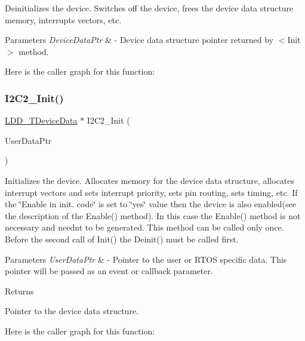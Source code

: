 Deinitializes the device. Switches off the device, frees the device data structure memory, interrupts vectors, etc. 


\begin{DoxyParams}{Parameters}
{\em Device\+Data\+Ptr} & -\/ Device data structure pointer returned by $<$\+Init$>$ method. \\
\hline
\end{DoxyParams}
Here is the caller graph for this function\+:
\mbox{\label{group___i2_c2__module_gaedf92a853b529ab46925ac39933f5033}} 
\subsubsection{\texorpdfstring{I2\+C2\+\_\+\+Init()}{I2C2\_Init()}}
{\footnotesize\ttfamily \hyperlink{group___p_e___types__module_gac5cf1362f1f0e3a2ce71b1bf2276d091}{L\+D\+D\+\_\+\+T\+Device\+Data} $\ast$ I2\+C2\+\_\+\+Init (\begin{DoxyParamCaption}\item[{\hyperlink{group___p_e___types__module_ga0b66a73f87238a782318aa0be7578e35}{L\+D\+D\+\_\+\+T\+User\+Data} $\ast$}]{User\+Data\+Ptr }\end{DoxyParamCaption})}



Initializes the device. Allocates memory for the device data structure, allocates interrupt vectors and sets interrupt priority, sets pin routing, sets timing, etc. If the \char`\"{}\+Enable in init. code\char`\"{} is set to \char`\"{}yes\char`\"{} value then the device is also enabled(see the description of the Enable() method). In this case the Enable() method is not necessary and needn\textquotesingle{}t to be generated. This method can be called only once. Before the second call of Init() the Deinit() must be called first. 


\begin{DoxyParams}{Parameters}
{\em User\+Data\+Ptr} & -\/ Pointer to the user or R\+T\+OS specific data. This pointer will be passed as an event or callback parameter. \\
\hline
\end{DoxyParams}
\begin{DoxyReturn}{Returns}

\begin{DoxyItemize}
\item Pointer to the device data structure. 
\end{DoxyItemize}
\end{DoxyReturn}
Here is the caller graph for this function\+:
\mbox{\label{group___i2_c2__module_ga782ad56e307e99306dfcbb7359a712af}} 
